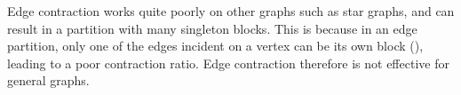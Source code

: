 \begin{gram}
Edge contraction works quite poorly on other graphs such as star graphs,
and can result in a partition with many singleton blocks.
%
This is because in an edge partition, only one of the edges incident
on a vertex can be its own block
(),
leading to a poor contraction ratio.
%
Edge contraction therefore is not effective for general graphs.
\end{gram}






 


